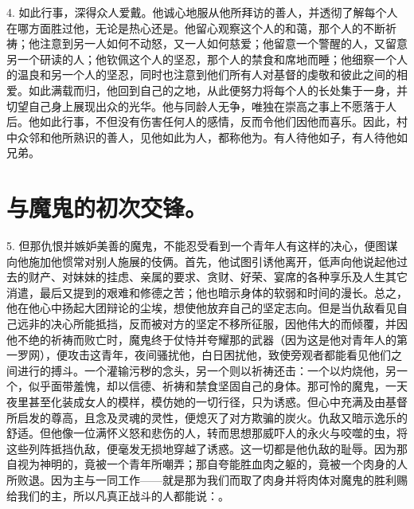 4. 如此行事，深得众人爱戴。他诚心地服从他所拜访的善人，并透彻了解每个人在哪方面胜过他，无论是热心还是。他留心观察这个人的和蔼，那个人的不断祈祷；他注意到另一人如何不动怒，又一人如何慈爱；他留意一个警醒的人，又留意另一个研读的人；他钦佩这个人的坚忍，那个人的禁食和席地而睡；他细察一个人的温良和另一个人的坚忍，同时也注意到他们所有人对基督的虔敬和彼此之间的相爱。如此满载而归，他回到自己的之地，从此便努力将每个人的长处集于一身，并切望自己身上展现出众的光华。他与同龄人无争，唯独在崇高之事上不愿落于人后。他如此行事，不但没有伤害任何人的感情，反而令他们因他而喜乐。因此，村中众邻和他所熟识的善人，见他如此为人，都称他为。有人待他如子，有人待他如兄弟。\par


\section{与魔鬼的初次交锋。}

5. 但那仇恨并嫉妒美善的魔鬼，不能忍受看到一个青年人有这样的决心，便图谋向他施加他惯常对别人施展的伎俩。首先，他试图引诱他离开，低声向他说起他过去的财产、对妹妹的挂虑、亲属的要求、贪财、好荣、宴席的各种享乐及人生其它消遣，最后又提到的艰难和修德之苦；他也暗示身体的软弱和时间的漫长。总之，他在他心中扬起大团辩论的尘埃，想使他放弃自己的坚定志向。但是当仇敌看见自己远非的决心所能抵挡，反而被对方的坚定不移所征服，因他伟大的而倾覆，并因他不绝的祈祷而败亡时，魔鬼终于仗恃并夸耀那的武器（因为这是他对青年人的第一罗网），便攻击这青年，夜间骚扰他，白日困扰他，致使旁观者都能看见他们之间进行的搏斗。一个灌输污秽的念头，另一个则以祈祷还击：一个以灼烧他，另一个，似乎面带羞愧，却以信德、祈祷和禁食坚固自己的身体。那可怜的魔鬼，一天夜里甚至化装成女人的模样，模仿她的一切行径，只为诱惑。但心中充满及由基督所启发的尊高，且念及灵魂的灵性，便熄灭了对方欺骗的炭火。仇敌又暗示逸乐的舒适。但他像一位满怀义怒和悲伤的人，转而思想那威吓人的永火与咬噬的虫，将这些列阵抵挡仇敌，便毫发无损地穿越了诱惑。这一切都是他仇敌的耻辱。因为那自视为神明的，竟被一个青年所嘲弄；那自夸能胜血肉之躯的，竟被一个肉身的人所败退。因为主与一同工作——就是那为我们而取了肉身并将肉体对魔鬼的胜利赐给我们的主，所以凡真正战斗的人都能说：。\par

